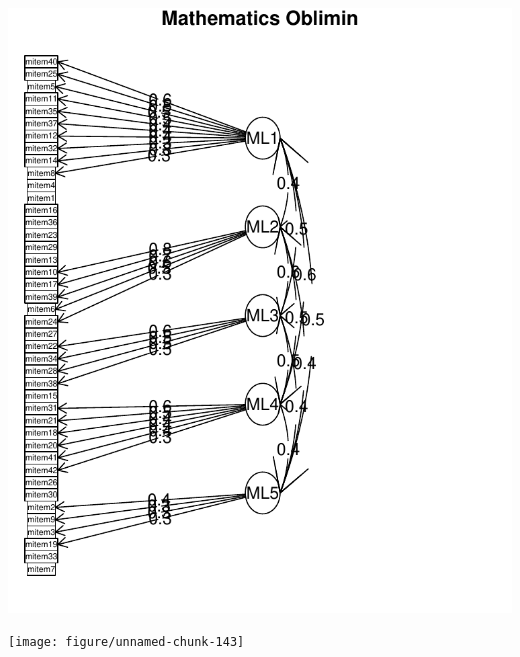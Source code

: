 \documentclass{article}\usepackage[]{graphicx}\usepackage[]{color}
\makeatletter
\def\maxwidth{ %
  \ifdim\Gin@nat@width>\linewidth
    \linewidth
  \else
    \Gin@nat@width
  \fi
}
\newenvironment{knitrout}{}{} %
\makeatother
\begin{document}
\begin{knitrout}
\includegraphics[width=\maxwidth]{figure/unnamed-chunk-142} 

\texttt{[image: figure/unnamed-chunk-143]} 

\end{knitrout}
\end{document}
